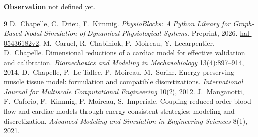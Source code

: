 \documentclass[11pt,a4paper]{article}
\begin{document}
\textbf{Observation} not defined yet.

\begin{thebibliography}{9}
 D.~Chapelle, C.~Drieu, F.~Kimmig. \emph{PhysioBlocks: A Python Library for Graph-Based Nodal Simulation of Dynamical Physiological Systems.} Preprint, 2026. \href{https://hal.science/hal-05436182v2}{hal-05436182v2}.
 M.~Caruel, R.~Chabiniok, P.~Moireau, Y.~Lecarpentier, D.~Chapelle. Dimensional reductions of a cardiac model for effective validation and calibration. \emph{Biomechanics and Modeling in Mechanobiology} 13(4):897--914, 2014.
 D.~Chapelle, P.~Le Tallec, P.~Moireau, M.~Sorine. Energy-preserving muscle tissue model: formulation and compatible discretizations. \emph{International Journal for Multiscale Computational Engineering} 10(2), 2012.
 J.~Manganotti, F.~Caforio, F.~Kimmig, P.~Moireau, S.~Imperiale. Coupling reduced-order blood flow and cardiac models through energy-consistent strategies: modeling and discretization. \emph{Advanced Modeling and Simulation in Engineering Sciences} 8(1), 2021.
\end{thebibliography}
\end{document}

